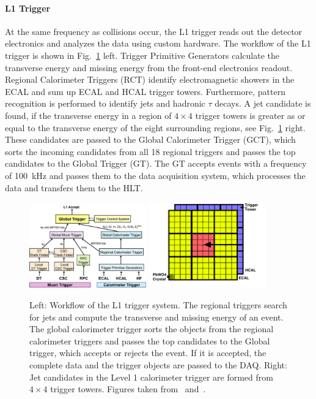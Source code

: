 \paragraph{L1 Trigger} 
At the same frequency as collisions occur, the L1 trigger reads out the detector
electronics and analyzes the data using custom hardware. The workflow of the L1
trigger is shown in Fig.~\ref{fig:cms:l1_trigger} left. Trigger Primitive Generators
calculate the transverse energy and missing energy from the front-end electronics
readout. Regional Calorimeter Triggers (RCT) identify electromagnetic showers
in the ECAL and sum up ECAL and HCAL trigger towers. Furthermore, pattern
recognition is performed to identify jets and hadronic $\tau$ decays. A jet
candidate is found, if the transverse energy in a region of $4\times4$ trigger
towers is greater as or equal to the transverse energy of the eight surrounding
regions, see Fig.~\ref{fig:cms:l1_trigger} right. These
candidates are passed to the Global Calorimeter Trigger (GCT), which sorts the
incoming candidates from all 18 regional triggers and passes the top
candidates to the Global Trigger (GT). The GT accepts events with a frequency
of \SI{100}{\kilo\hertz} and passes them to the data acquisition system, which
processes the data and transfers them to the HLT.

\begin{figure}[tbhp]
    \centering
    \includegraphics[width=0.45\textwidth]{figures/experimental_setup/cms_l1_trigger_new.pdf}\hfill
    \includegraphics[width=0.45\textwidth]{figures/experimental_setup/l1_calo_towers.png}\hfill
    \caption[The L1 trigger of CMS]{Left: Workflow of the L1 trigger system. The
        regional triggers search for jets and compute the transverse and missing
        energy of an event. The global calorimeter trigger sorts the objects
        from the regional calorimeter triggers and passes the top candidates to
        the Global trigger, which accepts or rejects the event. If it is
        accepted, the complete data and the trigger objects are passed to the
        DAQ. Right: Jet candidates in the Level 1 calorimeter trigger are formed from $4\times4$ trigger
        towers. Figures taken from~\cite{Bayatian:922757} and~\cite{Rose:2009zz}.} 
    \label{fig:cms:l1_trigger}
\end{figure}


